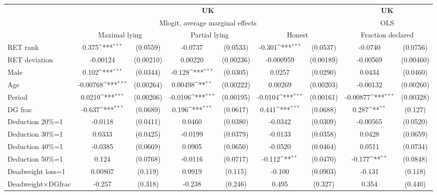 \def\sym#1{\ifmmode^{#1}\else\(^{#1}\)\fi}
\begin{tabular}{l|cccccc|cc}
\hline\hline
&\multicolumn{6}{c|}{\bf UK}&\multicolumn{2}{c}{\bf UK}\\ &\multicolumn{6}{c|}{Mlogit, average marginal effects }&\multicolumn{2}{c}{OLS}\\
                &\multicolumn{2}{c}{Maximal lying}&\multicolumn{2}{c}{Partial lying}&\multicolumn{2}{c}{Honest}  &\multicolumn{2}{c}{Fraction declared}\\
\hline
RET rank        &    0.375\sym{***}& (0.0559)&  -0.0737         & (0.0533)&   -0.301\sym{***}& (0.0537)&  -0.0740         & (0.0756)\\
RET deviation   & -0.00124         &(0.00210)&  0.00220         &(0.00236)&-0.000959         &(0.00189)& -0.00569         &(0.00460)\\
Male            &    0.102\sym{***}& (0.0344)&   -0.128\sym{***}& (0.0305)&   0.0257         & (0.0290)&   0.0434         & (0.0460)\\
Age             & -0.00768\sym{***}&(0.00264)&  0.00498\sym{**} &(0.00222)&  0.00269         &(0.00203)& -0.00132         &(0.00260)\\
Period          &   0.0210\sym{***}&(0.00206)&  -0.0106\sym{***}&(0.00195)&  -0.0104\sym{***}&(0.00161)& -0.00877\sym{***}&(0.00328)\\
DG frac         &   -0.637\sym{***}& (0.0689)&    0.196\sym{***}& (0.0617)&    0.441\sym{***}& (0.0688)&    0.287\sym{**} &  (0.127)\\
Deduction 20\%=1&  -0.0118         & (0.0411)&   0.0460         & (0.0380)&  -0.0342         & (0.0309)& -0.00565         & (0.0520)\\
Deduction 30\%=1&   0.0333         & (0.0425)&  -0.0199         & (0.0379)&  -0.0133         & (0.0358)&   0.0428         & (0.0659)\\
Deduction 40\%=1&  -0.0385         & (0.0669)&   0.0905         & (0.0650)&  -0.0520         & (0.0464)&   0.0511         & (0.0734)\\
Deduction 50\%=1&    0.124         & (0.0768)&  -0.0116         & (0.0717)&   -0.112\sym{**} & (0.0470)&   -0.177\sym{**} & (0.0848)\\
Deadweight loss=1&  0.00807         &  (0.119)&   0.0919         &  (0.115)&   -0.100         & (0.0903)&   -0.131         &  (0.118)\\
Deadweight$\times$\space{}DG\space{}frac&   -0.257         &  (0.318)&   -0.238         &  (0.246)&    0.495         &  (0.327)&    0.354         &  (0.440)\\

\end{tabular}
